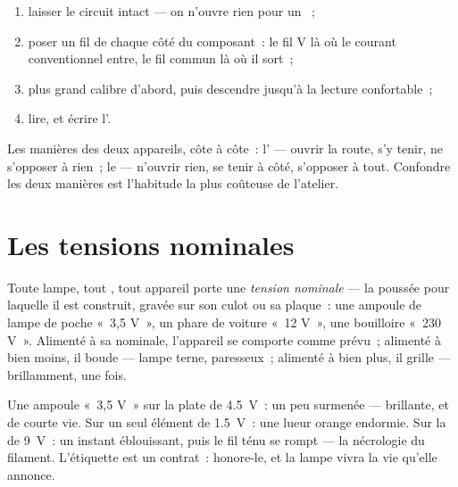 \begin{method}\label{met:g8:voltage-voltmeter:measure}
\begin{enumerate}
  \item laisser le circuit intact --- on n'ouvre rien pour un
        ~;
  \item poser un fil de chaque côté du composant~: le fil \unit{V}
        là où le courant conventionnel entre, le fil commun là où
        il sort~;
  \item plus grand calibre d'abord, puis descendre jusqu'à la
        lecture confortable~;
  \item lire, et écrire l'.
\end{enumerate}
Les manières des deux appareils, côte à côte~: l' ---
ouvrir la route, s'y tenir, ne s'opposer à rien~; le  ---
n'ouvrir rien, se tenir à côté, s'opposer à tout. Confondre les deux
manières est l'habitude la plus coûteuse de l'atelier.
\end{method}

\section{Les tensions nominales}

\begin{definition}\label{def:g8:voltage-voltmeter:nominal}
Toute lampe, tout , tout appareil porte une \emph{tension
nominale} --- la poussée pour laquelle il est
construit, gravée sur son culot ou sa plaque~: une ampoule de lampe
de poche «~3,5 V~», un phare de voiture «~12 V~», une bouilloire
«~230 V~». Alimenté à sa  nominale, l'appareil se comporte
comme prévu~; alimenté à bien moins, il boude --- lampe terne, 
paresseux~; alimenté à bien plus, il grille --- brillamment, une
fois.
\end{definition}

\begin{example}\label{ex:g8:voltage-voltmeter:matching}
Une ampoule «~3,5 V~» sur la  plate de \qty{4.5}{V}~: un peu
surmenée --- brillante, et de courte vie. Sur un seul élément de
\qty{1.5}{V}~: une lueur orange endormie. Sur la  de
\qty{9}{V}~: un instant éblouissant, puis le fil ténu se rompt ---
la nécrologie du filament. L'étiquette est un contrat~: honore-le, et
la lampe vivra la vie qu'elle annonce.
\end{example}

